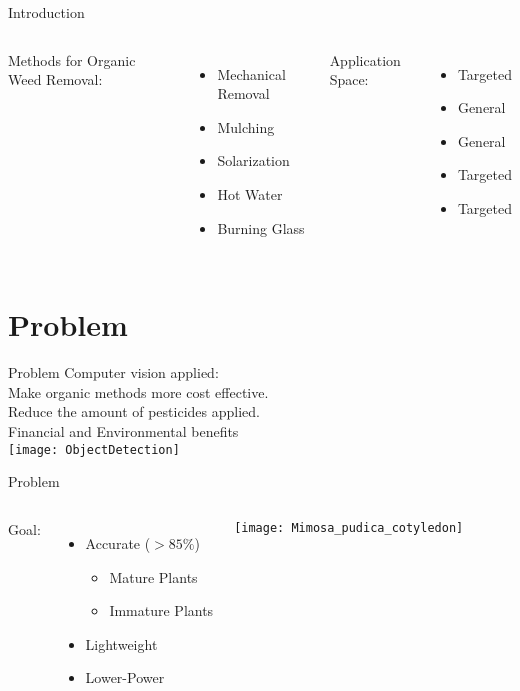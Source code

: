 \documentclass{beamer}
\begin{document}
\begin{frame}{Introduction}
	\begin{columns}
		Methods for Organic Weed Removal:
		\begin{itemize}
			\item Mechanical Removal
			\item Mulching
			\item Solarization
			\item Hot Water
			\item Burning Glass
		\end{itemize}
	
		\vspace{1em}
		Application Space:
		\begin{itemize}
			\item Targeted
			\item General
			\item General
			\item Targeted
			\item Targeted
		\end{itemize}
	\end{columns}
\end{frame}

\section[Problem]{Problem}

\begin{frame}{Problem}
	Computer vision applied: \\
	Make organic methods more cost effective. \\
	Reduce the amount of pesticides applied. \\ \vspace{1em}
	Financial and Environmental benefits \\
	\centering
	\texttt{[image: ObjectDetection]}
\end{frame}

\begin{frame}{Problem}
	\begin{columns}
		\column{0.5\textwidth}
		Goal:
		\begin{itemize}
			\item Accurate ($>85\%$)
			\begin{itemize}
				\item Mature Plants
				\item Immature Plants
			\end{itemize}
			\item Lightweight
			\item Lower-Power
		\end{itemize}
		\column{0.5\textwidth}
		\texttt{[image: Mimosa\_pudica\_cotyledon]}
	\end{columns}
\end{frame}
\end{document}

